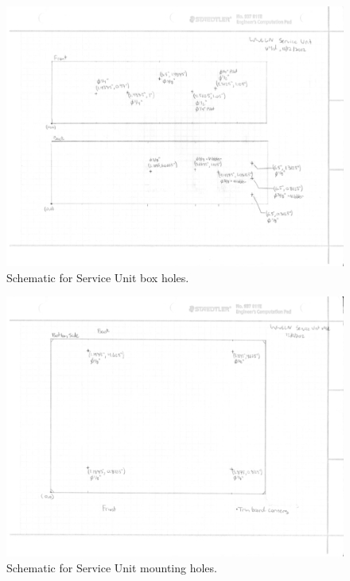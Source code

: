 \begin{landscape}
\begin{figure}[ht!]
   \centering
   \includegraphics[scale=1]{Appendix/Figures/su_box_holes_sides.pdf} 
   \caption{Schematic for Service Unit box holes.}
   \label{app:suBox}
\end{figure}
\end{landscape}

\begin{landscape}
\begin{figure}[ht!]
   \centering
   \includegraphics[scale=1]{Appendix/Figures/su_box_holes_bottom.pdf} 
   \caption{Schematic for Service Unit mounting holes.}
   \label{app:suBoxBot}
\end{figure}
\end{landscape}

